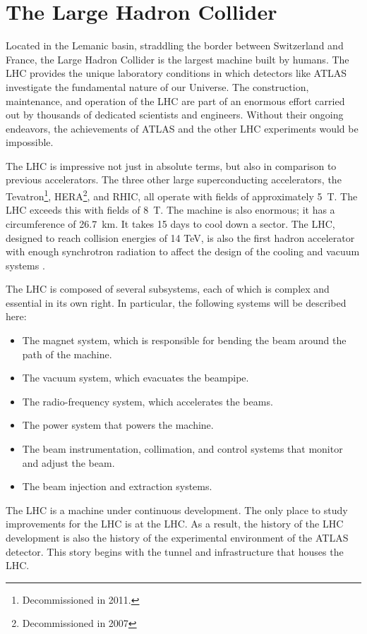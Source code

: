 \section{The Large Hadron Collider}

Located in the Lemanic basin, straddling the border between Switzerland and France, the Large Hadron Collider is the largest machine built by humans.
The LHC provides the unique laboratory conditions in which detectors like ATLAS investigate the fundamental nature of our Universe.
The construction, maintenance, and operation of the LHC are part of an enormous effort carried out by thousands of dedicated scientists and engineers. Without their ongoing endeavors, the achievements of ATLAS and the other LHC experiments would be impossible.

The LHC is impressive not just in absolute terms, but also in comparison to previous accelerators.
The three other large superconducting accelerators, the Tevatron\footnote{Decommissioned in 2011.}, HERA\footnote{Decommissioned in 2007}, and RHIC, all operate with fields of approximately 5~T. The LHC exceeds this with fields of 8~T.
The machine is also enormous; it has a circumference of 26.7~km. It takes 15 days to cool down a sector.
The LHC, designed to reach collision energies of 14 TeV, is also the first hadron accelerator with enough synchrotron radiation to affect the design of the cooling and vacuum systems \cite{lyndon}.

The LHC is composed of several subsystems, each of which is complex and essential in its own right.
In particular, the following systems will be described here:
\begin{itemize}
    \item The magnet system, which is responsible for bending the beam around the path of the machine.
    \item The vacuum system, which evacuates the beampipe.
    \item The radio-frequency system, which accelerates the beams. 
    \item The power system that powers the machine.
    \item The beam instrumentation, collimation, and control systems that monitor and adjust the beam.
    \item The beam injection and extraction systems.
\end{itemize}
The LHC is a machine under continuous development. The only place to study improvements for the LHC is at the LHC.
As a result, the history of the LHC development is also the history of the experimental environment of the ATLAS detector.
This story begins with the tunnel and infrastructure that houses the LHC.


